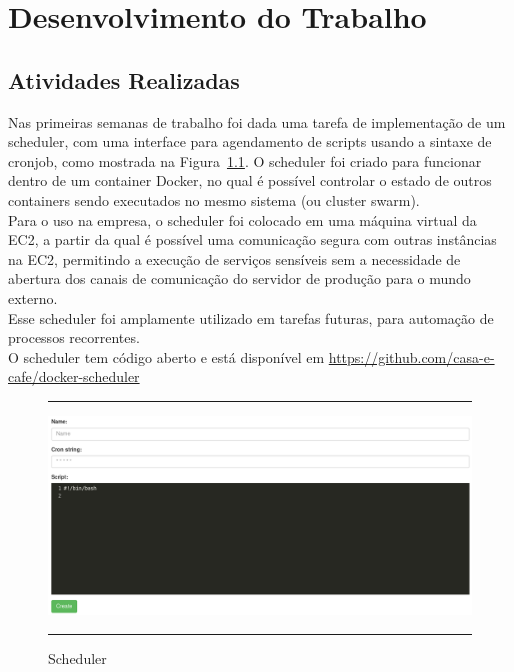 \chapter{Desenvolvimento do Trabalho}\label{chap:atividadesRealizadas}


\section{Atividades Realizadas}

Nas primeiras semanas de trabalho foi dada uma tarefa de implementação de um \gls{scheduler}, com uma interface para agendamento de scripts usando a sintaxe de \gls{cronjob}, como mostrada na Figura~\ref{fig:scheduler}. O \gls{scheduler} foi criado para funcionar dentro de um \gls{container} \gls{Docker}, no qual é possível controlar o estado de outros \glspl{container} sendo executados no mesmo sistema (ou \gls{cluster swarm}).\\

Para o uso na empresa, o \gls{scheduler} foi colocado em uma máquina virtual da \gls{EC2}, a partir da qual é possível uma comunicação segura com outras instâncias na \gls{EC2}, permitindo a execução de serviços sensíveis sem a necessidade de abertura dos canais de comunicação do servidor de produção para o mundo externo.\\

Esse \gls{scheduler} foi amplamente utilizado em tarefas futuras, para automação de processos recorrentes.\\

O \gls{scheduler} tem código aberto e está disponível em \url{https://github.com/casa-e-cafe/docker-scheduler}\\

\begin{figure}[h]
  \rule[1ex]{\textwidth}{0.25pt}
  \centering\includegraphics[width=1.00\textwidth]{img/scheduler.png}
  \caption[Scheduler]
  {Scheduler}\label{fig:scheduler}
  \rule[1ex]{\textwidth}{0.25pt}
\end{figure}

